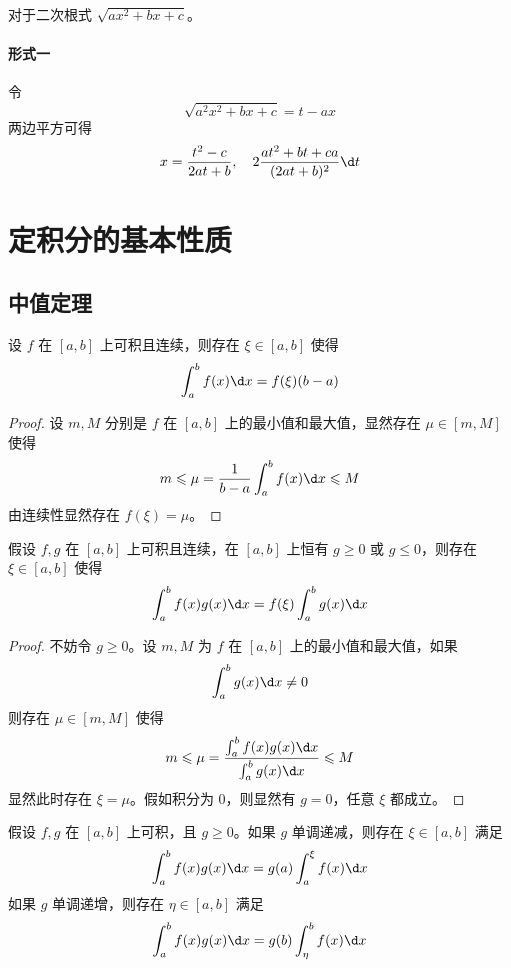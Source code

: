 对于二次根式 $\sqrt{a x^2 + b x + c}$。

\paragraph{形式一} 令
\[ \sqrt{a^2x^2+bx+c} = t - ax \]
两边平方可得
\[ x = \frac{t^2 - c}{2at + b}, \quad 2\frac{at^2 + bt + ca}{(2at+b)^2} \d t \]

\section{定积分的基本性质}

\subsection{中值定理}

\begin{theorem}[积分第一中值定理]
	设 $f$ 在 $[a,b]$ 上可积且连续，则存在 $\xi \in [a, b]$ 使得
	\[ \int_{a}^{b} f(x) \d x = f(\xi) (b-a) \]
\end{theorem}

\begin{proof}
	设 $m, M$ 分别是 $f$ 在 $[a,b]$ 上的最小值和最大值，显然存在 $\mu \in [m, M]$ 使得
	\[ m \leqslant \mu = \frac{1}{b-a}\int_{a}^{b} f(x) \d x \leqslant M \]
	由连续性显然存在 $f(\xi) = \mu$。
\end{proof}

\begin{theorem}[广义积分第一中值定理]
	假设 $f, g$ 在 $[a, b]$ 上可积且连续，在 $[a,b]$ 上恒有 $g \geqslant 0$ 或 $g \leqslant 0$，则存在 $\xi \in [a,b]$ 使得
	\[ \int_{a}^{b} f(x)g(x) \d x = f(\xi) \int_{a}^{b} g(x) \d x \]
\end{theorem}

\begin{proof}
	不妨令 $g \geqslant 0$。设 $m, M$ 为 $f$ 在 $[a, b]$ 上的最小值和最大值，如果
	\[ \int_{a}^{b} g(x) \d x \neq 0 \]
	则存在 $\mu \in [m, M]$ 使得
	\[ m \leqslant \mu = \frac{ \int_{a}^{b} f(x)g(x) \d x}{\int_{a}^{b} g(x) \d x} \leqslant M \]
	显然此时存在 $\xi = \mu$。假如积分为 $0$，则显然有 $g = 0$，任意 $\xi$ 都成立。
\end{proof}

\begin{theorem}[积分第二中值定理]
	假设 $f, g$ 在 $[a,b]$ 上可积，且 $g \geqslant 0$。如果 $g$ 单调递减，则存在 $\xi \in [a, b]$ 满足
	\[ \int_{a}^{b} f(x) g(x) \d x = g(a) \int_{a}^{\xi} f(x) \d x \]
	如果 $g$ 单调递增，则存在 $\eta \in [a, b]$ 满足
	\[ \int_{a}^{b} f(x) g(x) \d x = g(b) \int_{\eta}^{b} f(x) \d x \]
\end{theorem}

